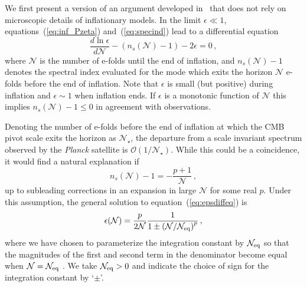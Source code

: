 We first present a version of an argument developed in~\cite{Mukhanov:2013tua,Roest:2013fha,Creminelli:2014nqa} that does not rely on microscopic details of inflationary models. In the limit $\epsilon\ll1$, equations~(\ref{eq:inf_Pzeta}) and~(\ref{eq:specind}) lead to a differential equation
\begin{equation}\label{eq:epsdiffeq}
\frac{d\ln\epsilon}{d\mathcal{N}}-(n_s(\mathcal{N})-1)-2\epsilon=0\,,
\end{equation} 
where $\mathcal{N}$ is the number of e-folds until the end of inflation, and $n_s(\mathcal{N})-1$ denotes the spectral index evaluated for the mode which exits the horizon $\mathcal{N}$ e-folds before the end of inflation. Note that $\epsilon$ is small (but positive) during inflation and $\epsilon\sim 1$ when inflation ends. If $\epsilon$ is a monotonic function of $\mathcal{N}$ this implies $n_s(\mathcal{N})-1\leq 0$ in agreement with observations. 

Denoting the number of e-folds before the end of inflation at which the CMB pivot scale exits the horizon as $\mathcal{N}_\star$, the departure from a scale invariant spectrum observed by the {\it Planck} satellite is $\mathcal{O}(1/\mathcal{N}_\star)$. While this could be a coincidence, it would find a natural explanation if 
\begin{equation}\label{eq:nsassump}
n_s(\mathcal{N})-1=-\frac{p+1}{\mathcal{N}}\,,
\end{equation}
up to subleading corrections in an expansion in large $\mathcal{N}$ for some real $p$. Under this assumption, the general solution to equation~(\ref{eq:epsdiffeq}) is
\begin{equation}\label{eq:epssol}
\epsilon(\mathcal{N})=\frac{p}{2\mathcal{N}}\frac{1}{1\pm\left(\mathcal{N}/\mathcal{N}_{\rm eq}\right)^{p}}\,,
\end{equation}
where we have chosen to parameterize the integration constant by $\mathcal{N}_{\rm eq}$ so that the magnitudes of the first and second term in the denominator become equal when $\mathcal{N}=\mathcal{N}_{\rm eq}$ . We take $\mathcal{N}_{\rm eq}>0$ and indicate the choice of sign for the integration constant by `$\pm$'. 

